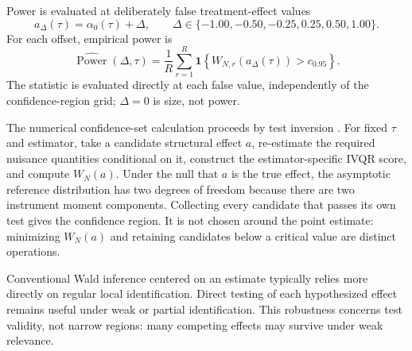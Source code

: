 Power is evaluated at deliberately false treatment-effect values
\begin{equation}
  a_{\Delta}(\tau)=\alpha_0(\tau)+\Delta,
  \qquad
  \Delta\in\{-1.00,-0.50,-0.25,0.25,0.50,1.00\}.
  \label{eq:performance-alternatives}
\end{equation}
For each offset, empirical power is
\begin{equation}
  \widehat{\operatorname{Power}}(\Delta,\tau)
    =\frac{1}{R}\sum_{r=1}^{R}
      \mathbf{1}\!\left\{W_{N,r}\!\left(a_{\Delta}(\tau)\right)>c_{0.95}\right\}.
  \label{eq:performance-power}
\end{equation}
The statistic is evaluated directly at each false value, independently of the confidence-region grid; $\Delta=0$ is size, not power.

The numerical confidence-set calculation proceeds by test inversion \parencite{chernozhukov_hansen_2008}. For fixed $\tau$ and estimator, take a candidate structural effect $a$, re-estimate the required nuisance quantities conditional on it, construct the estimator-specific IVQR score, and compute $W_N(a)$. Under the null that $a$ is the true effect, the asymptotic reference distribution has two degrees of freedom because there are two instrument moment components. Collecting every candidate that passes its own test gives the confidence region. It is not chosen around the point estimate: minimizing $W_N(a)$ and retaining candidates below a critical value are distinct operations.

Conventional Wald inference centered on an estimate typically relies more directly on regular local identification. Direct testing of each hypothesized effect remains useful under weak or partial identification. This robustness concerns test validity, not narrow regions: many competing effects may survive under weak relevance.

